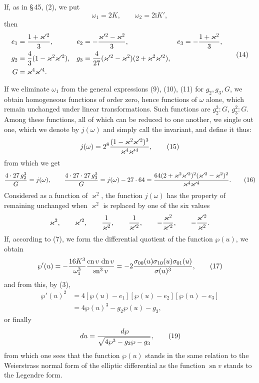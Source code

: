 \documentclass[11pt]{article}
\providecommand{\dd}{\,d}
\providecommand{\sn}{\operatorname{sn}}
\providecommand{\cn}{\operatorname{cn}}
\providecommand{\dn}{\operatorname{dn}}
\providecommand{\ii}{\mathrm{i}}
\begin{document}
If, as in \S\,45, (2), we put
\[
\omega_1=2K,
\qquad
\omega_2=2\ii K',
\]
then
\begin{equation}
\begin{aligned}
e_1&={1+\varkappa'^2\over3},&
 e_2&=-{\varkappa'^2-\varkappa^2\over3},&
 e_3&=-{1+\varkappa^2\over3},\\
g_2&={4\over3}(1-\varkappa^2\varkappa'^2),&
 g_3&={4\over27}(\varkappa'^2-\varkappa^2)(2+\varkappa^2\varkappa'^2),\\
G&=\varkappa^4\varkappa'^4.
\end{aligned}
\tag{14}
\end{equation}

If we eliminate $\omega_1$ from the general expressions (9), (10), (11) for $g_2,g_3,G$, we obtain homogeneous functions of order zero, hence functions of $\omega$ alone, which remain unchanged under linear transformations. Such functions are $g_2^3:G$, $g_3^2:G$. Among these functions, all of which can be reduced to one another, we single out one, which we denote by $j(\omega)$ and simply call the invariant, and define it thus:
\begin{equation}
 j(\omega)=2^8{(1-\varkappa^2\varkappa'^2)^3\over\varkappa^4\varkappa'^4},
\tag{15}
\end{equation}
from which we get
\begin{equation}
 {4\cdot27\,g_2^3\over G}=j(\omega),
\qquad
 {4\cdot27\cdot27\,g_3^2\over G}=j(\omega)-27\cdot64
 ={64(2+\varkappa^2\varkappa'^2)^2(\varkappa'^2-\varkappa^2)^2\over\varkappa^4\varkappa'^4}.
\tag{16}
\end{equation}
Considered as a function of $\varkappa^2$, the function $j(\omega)$ has the property of remaining unchanged when $\varkappa^2$ is replaced by one of the six values
\[
\varkappa^2,
\qquad \varkappa'^2,
\qquad {1\over\varkappa^2},
\qquad {1\over\varkappa'^2},
\qquad -{\varkappa^2\over\varkappa'^2},
\qquad -{\varkappa'^2\over\varkappa^2}.
\]
If, according to (7), we form the differential quotient of the function $\wp(u)$, we obtain
\begin{equation}
\wp'(u)=-{16K^3\over\omega_1^3}{\cn v\,\dn v\over\sn^3v}
=-2{\sigma_{00}(u)\sigma_{10}(u)\sigma_{01}(u)\over\sigma(u)^3},
\tag{17}
\end{equation}
and from this, by (3),
\begin{equation}
\begin{aligned}
\wp'(u)^2&=4[\wp(u)-e_1][\wp(u)-e_2][\wp(u)-e_3]\\
&=4\wp(u)^3-g_2\wp(u)-g_3,
\end{aligned}
\tag{18}
\end{equation}
or finally
\begin{equation}
\dd u={\dd\wp\over\sqrt{4\wp^3-g_2\wp-g_3}},
\tag{19}
\end{equation}
from which one sees that the function $\wp(u)$ stands in the same relation to the Weierstrass normal form of the elliptic differential as the function $\sn v$ stands to the Legendre form.
\end{document}
